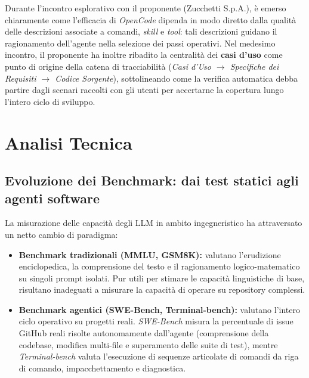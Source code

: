 \documentclass[a4paper, 11pt]{article}
\begin{document}
Durante l'incontro esplorativo con il proponente (Zucchetti S.p.A.), è emerso chiaramente come l'efficacia di \textit{OpenCode} dipenda in modo diretto dalla qualità delle descrizioni associate a comandi, \textit{skill} e \textit{tool}: tali descrizioni guidano il ragionamento dell'agente nella selezione dei passi operativi. Nel medesimo incontro, il proponente ha inoltre ribadito la centralità dei \textbf{casi d'uso} come punto di origine della catena di tracciabilità (\textit{Casi d'Uso $\rightarrow$ Specifiche dei Requisiti $\rightarrow$ Codice Sorgente}), sottolineando come la verifica automatica debba partire dagli scenari raccolti con gli utenti per accertarne la copertura lungo l'intero ciclo di sviluppo.


\section{Analisi Tecnica}

\subsection{Evoluzione dei Benchmark: dai test statici agli agenti software}
La misurazione delle capacità degli LLM in ambito ingegneristico ha attraversato un netto cambio di paradigma:
\begin{itemize}[noitemsep]
    \item \textbf{Benchmark tradizionali (MMLU, GSM8K):} valutano l'erudizione enciclopedica, la comprensione del testo e il ragionamento logico-matematico su singoli prompt isolati. Pur utili per stimare le capacità linguistiche di base, risultano inadeguati a misurare la capacità di operare su repository complessi.
    \item \textbf{Benchmark agentici (SWE-Bench, Terminal-bench):} valutano l'intero ciclo operativo su progetti reali. \textit{SWE-Bench} misura la percentuale di issue GitHub reali risolte autonomamente dall'agente (comprensione della codebase, modifica multi-file e superamento delle suite di test), mentre \textit{Terminal-bench} valuta l'esecuzione di sequenze articolate di comandi da riga di comando, impacchettamento e diagnostica.
\end{itemize}
\end{document}

